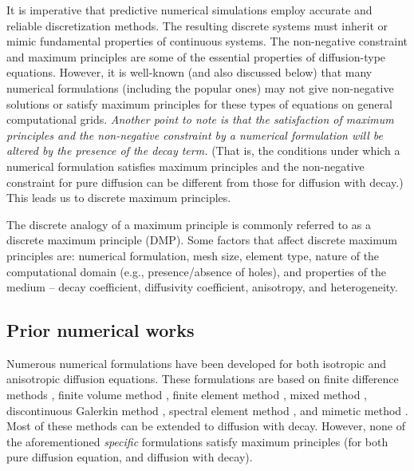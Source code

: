 \documentclass[11pt]{amsart}
\begin{document}
It is imperative that predictive numerical simulations employ accurate and reliable 
discretization methods. The resulting discrete systems must inherit or mimic fundamental 
properties of continuous systems. The non-negative constraint and maximum principles are 
some of the essential properties of diffusion-type equations. However, it is well-known (and 
also discussed below) that many numerical formulations (including the popular ones) may 
not give non-negative solutions or satisfy maximum principles for these types of equations 
on general computational grids. \emph{Another point to note is that the satisfaction of 
maximum principles and the non-negative constraint by a numerical formulation will be altered 
by the presence of the decay term.} (That is, the conditions under which a numerical 
formulation satisfies maximum principles and the non-negative constraint for pure diffusion 
can be different from those for diffusion with decay.) This leads us to discrete maximum 
principles.

The discrete analogy of a maximum principle is commonly referred to as a discrete 
maximum principle (DMP). Some factors that affect discrete maximum principles 
are: numerical formulation, mesh size, element type, nature of the computational 
domain (e.g., presence/absence of holes), and properties of the medium -- decay 
coefficient, diffusivity coefficient, anisotropy, and heterogeneity.  

\subsection{Prior numerical works}
Numerous numerical formulations have been developed for both isotropic and anisotropic 
diffusion equations. These formulations are based on finite difference methods 
\cite{Morton_Mayers,Strikwerda}, finite volume method \cite{Patankar,
Eigestad_Aavatsmark_Espedal_CompGeoSci_2002_v6_p381,Droniou_Eymard_NumerMath_2006_v105_p35}, 
finite element method \cite{Braess,Hughes}, mixed method \cite{Brezzi_Fortin,Raviart_Thomas_MAFEM_1977_p292,
Nedelec_NumerMath_1980_v35_p315,Nedelec_NumerMath_1986_v50_p57,
Brezzi_Douglas_Marini_NumerMath_1985_v47_p217,
Brezzi_Douglas_Durran_Marini_NumerMath_1987_v51_p237,
Brezzi_Douglas_Fortin_Marini_MMNA_1987_v21_p581,
Masud_Hughes_CMAME_2002_v191_p4341,Nakshatrala_Turner_Hjelmstad_Masud_CMAME_2006_v195_p4036}, 
discontinuous Galerkin method \cite{Arnold_Brezzi_Cockburn_Marini_SIAMJNA_2002_v39_p1749,
Hughes_Masud_Wan_CMAME_2006_v195_p3347,Brezzi_Hughes_Marini_Masud_SIAMJSC_2005_v22_p119}, 
spectral element method \cite{Karniadakis_Sherwin}, and mimetic method 
\cite{Hyman_Morel_Shashkov_Steinberg_CompGeoSci_2002_v6_p333,
Kuznetsov_Lipnikov_Shashkov_CompGeoSci_2004_v8_p301,Brezzi_Lipnikov_Shashkov_SIAMJNA_2005_v43_p1872,
Lipnikov_Shashkov_Svyatskiy_JCP_2006_v211_p473}. Most of these methods can be extended to diffusion 
with decay. However, none of the aforementioned \emph{specific} formulations satisfy maximum principles 
(for both pure diffusion equation, and diffusion with decay). 
\end{document}
